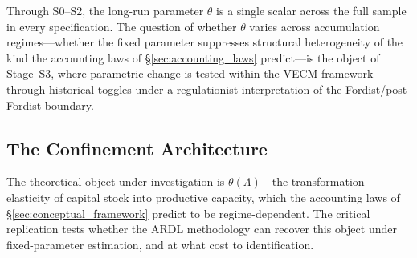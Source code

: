 \documentclass[11pt,a4paper]{article}
\begin{document}
Through S0--S2, the long-run parameter $\theta$ is a single scalar across
the full sample in every specification. The question of whether $\theta$
varies across accumulation regimes---whether the fixed parameter suppresses
structural heterogeneity of the kind the accounting laws of
\S\ref{sec:accounting_laws} predict---is the object of Stage~S3, where
parametric change is tested within the VECM framework through historical
toggles under a regulationist interpretation of the Fordist/post-Fordist
boundary.


%
%
%



\label{sec:results}



\subsection{The Confinement Architecture}
\label{subsec:confinement_architecture}

The theoretical object under investigation is $\theta(\Lambda)$---the transformation elasticity of capital stock into productive capacity, which the accounting laws of \S\ref{sec:conceptual_framework} predict to be regime-dependent. The critical replication tests whether the ARDL methodology can recover this object under fixed-parameter estimation, and at what cost to identification.
\end{document}

